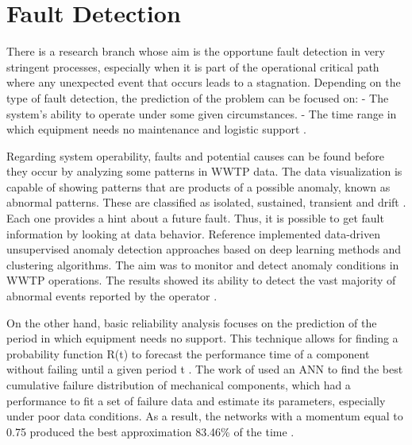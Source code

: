 \section{Fault Detection}
\label{s:RelatedWorks-faultDetection}

There is a research branch whose aim is the opportune fault detection in very stringent processes, especially when it is part of the operational critical path where any unexpected event that occurs leads to a stagnation. Depending on the type of fault detection, the prediction of the problem can be focused on:
- The system’s ability to operate under some given circumstances.
- The time range in which equipment needs no maintenance and logistic support \cite{Alsina2018}.

Regarding system operability, faults and potential causes can be found before they occur by analyzing some patterns in WWTP data. The data visualization is capable of showing patterns that are products of a possible anomaly, known as abnormal patterns. These are classified as isolated, sustained, transient and drift \cite{Newhart2019}. Each one provides a hint about a future fault. Thus, it is possible to get fault information by looking at data behavior. Reference \cite{Dairi2019} implemented data-driven unsupervised anomaly detection approaches based on deep learning methods and clustering algorithms. The aim was to monitor and detect anomaly conditions in WWTP operations. The results showed its ability to detect the vast majority of abnormal events reported by the operator \cite{Dairi2019}. 

On the other hand, basic reliability analysis focuses on the prediction of the period in which equipment needs no support. This technique allows for finding a probability function R(t) to forecast the performance time of a component without failing until a given period t \cite{Alsina2018}. The work of \cite{Alsina2016} used an ANN to find the best cumulative failure distribution of mechanical components, which had a performance to fit a set of failure data and estimate its parameters, especially under poor data conditions. As a result, the networks with a momentum equal to 0.75 produced the best approximation 83.46\% of the time \cite{Alsina2016}.



